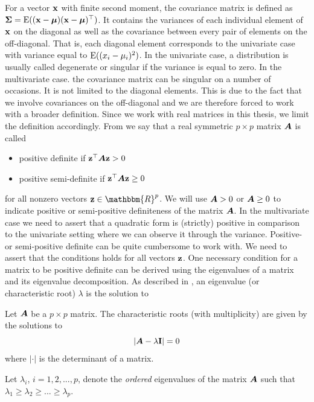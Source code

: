 \documentclass[]{book}\usepackage{knitr}
\begin{document}
For a vector $\mathbf{x}$ with finite second moment, the covariance matrix is defined as $\mathbf{\Sigma}=\operatorname{E}((\mathbf{x} - \mbox{\boldmath$\mu$})(\mathbf{x} - \mbox{\boldmath$\mu$})^\top)$. 
It contains the variances of each individual element of $\mathbf{x}$ on the diagonal as well as the covariance between every pair of elements on the off-diagonal. 
That is, each diagonal element corresponds to the univariate case with variance equal to $\operatorname{E}((x_i - \mu_i)^2)$. 
In the univariate case, a distribution is usually called degenerate or singular if the variance is equal to zero. 
In the multivariate case. the covariance matrix can be singular on a number of occasions. 
It is not limited to the diagonal elements.
This is due to the fact that we involve covariances on the off-diagonal and we are therefore forced to work with a broader definition.  
Since we work with real matrices in this thesis, we limit the definition accordingly. 
From \textcite[ch 14.2]{harville1997matrix} we say that a real symmetric $p\times p$ matrix $\mbox{\boldmath$A$}$ is called 
\begin{itemize}
	\item positive definite if $\mathbf{z}^\top \mbox{\boldmath$A$} \mathbf{z} > 0$
	\item positive semi-definite if $\mathbf{z}^\top \mbox{\boldmath$A$} \mathbf{z} \geq 0$
\end{itemize}
for all nonzero vectors $\bz \in \mathbbm{R}^p$.
We will use $\mbox{\boldmath$A$} > 0$ or $\mbox{\boldmath$A$} \geq 0$ to indicate positive or semi-positive definiteness of the matrix $\mbox{\boldmath$A$}$. 
In the multivariate case we need to assert that a quadratic form is (strictly) positive in comparison to the univariate setting where we can observe it through the variance. 
Positive- or semi-positive definite can be quite cumbersome to work with. 
We need to assert that the conditions holds for all vectors $\mathbf{z}$. 
One necessary condition for a matrix to be positive definite can be derived using the eigenvalues of a matrix and its eigenvalue decomposition. 
As described in \textcite[ch. 21]{harville1997matrix}, an eigenvalue (or characteristic root) $\lambda$ is the solution to 
\begin{definition}\label{def:eigenvalue} 
	Let $\mbox{\boldmath$A$}$ be a $p\times p$ matrix. The characteristic roots (with multiplicity) are given by the solutions to
	\begin{equation*}
		\left|\mbox{\boldmath$A$} - \lambda \mathbf{I}\right| = 0
	\end{equation*}
	where $|\cdot|$ is the determinant of a matrix.
\end{definition} 
Let $\lambda_i$, $i=1,2,...,p$, denote the \textit{ordered} eigenvalues of the matrix $\mbox{\boldmath$A$}$ such that $\lambda_1\geq \lambda_2 \geq ... \geq \lambda_p$.
\end{document}

